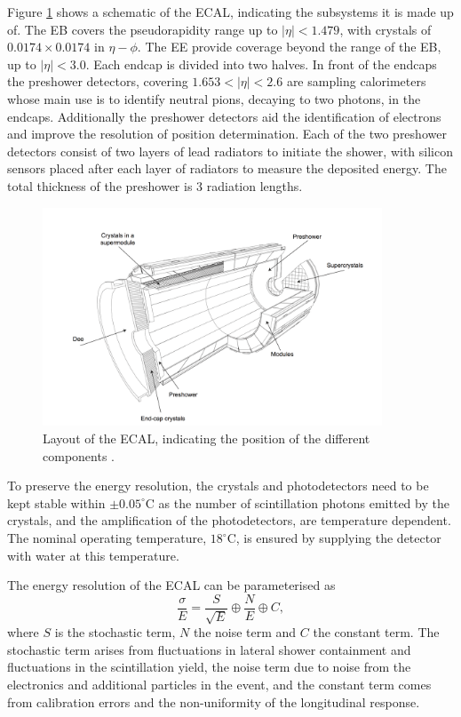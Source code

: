 Figure \ref{fig:CMS_ECAL} shows a schematic of the \ac{ECAL}, indicating
the subsystems it is made up of. The \ac{EB} 
covers the pseudorapidity range up to $|\eta|<1.479$, with
crystals of $0.0174 \times 0.0174$ in $\eta - \phi$. The \ac{EE}
provide coverage beyond the range of the \ac{EB}, up to $|\eta|<3.0$.
Each endcap is divided into two halves. In front of the endcaps 
the preshower detectors, covering $1.653<|\eta|<2.6$ are sampling
calorimeters whose main use is to identify neutral pions, decaying to two photons, 
in the endcaps. Additionally
the preshower detectors aid the identification of electrons and improve the resolution
of position determination. Each of the two preshower detectors consist
of two layers of lead radiators to initiate the shower, with silicon sensors
placed after each layer of radiators to measure the deposited energy. The 
total thickness of the preshower is 3 radiation lengths.

\begin{figure}[h!]
\begin{center}
\includegraphics[width=0.9\textwidth]{./Detector/Plots/ECAL.png}
\caption{Layout of the \ac{ECAL}, indicating the position of the
different components \cite{cms-jinst}.}
\label{fig:CMS_ECAL}
\end{center}
\end{figure}

To preserve the energy resolution, the crystals and
photodetectors need to be kept stable within $\pm 0.05^{\circ}$C
as the number of scintillation photons emitted by the crystals,
and the amplification of the photodetectors, are temperature dependent.
The nominal operating temperature, $18^{\circ}$C, is ensured by 
supplying the detector with water at this temperature.


The energy resolution of the \ac{ECAL} can be parameterised as
\begin{equation}\label{eqn:ecalres}
\frac{\sigma}{E} = \frac{S}{\sqrt{E}}\oplus\frac{N}{E}\oplus C,
\end{equation}
where $S$ is the stochastic term, $N$ the noise term and $C$ the constant term.
The stochastic term arises from fluctuations in lateral shower containment and 
fluctuations in the scintillation yield, the noise term due to noise from the electronics
and additional particles in the event, and the constant term comes
from calibration errors and the non-uniformity of the longitudinal response.

